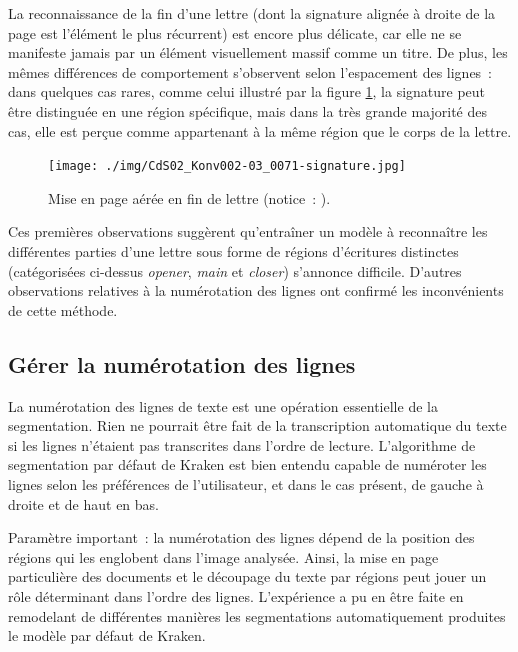 \documentclass[a4paper,12pt,twoside]{book}
\begin{document}
				La reconnaissance de la fin d'une lettre (dont la signature alignée à droite de la page est l'élément le plus récurrent) est encore plus délicate, car elle ne se manifeste jamais par un élément visuellement massif comme un titre. De plus, les mêmes différences de comportement s'observent selon l'espacement des lignes~: dans quelques cas rares, comme celui illustré par la figure \ref{seg-signaure-71}, la signature peut être distinguée en une région spécifique, mais dans la très grande majorité des cas, elle est perçue comme appartenant à la même région que le corps de la lettre.
				
				\begin{figure}[!h]
					\centering
					\texttt{[image: ./img/CdS02\_Konv002-03\_0071-signature.jpg]}%
					\caption{Mise en page aérée en fin de lettre (notice~: \cite{CdS02070071}).}%
					\label{seg-signaure-71}%
				\end{figure}
				
				Ces premières observations suggèrent qu'entraîner un modèle à reconnaître les différentes parties d'une lettre sous forme de régions d'écritures distinctes (catégorisées ci-dessus \textit{opener}, \textit{main} et \textit{closer}) s'annonce difficile. D'autres observations relatives à la numérotation des lignes ont confirmé les inconvénients de cette méthode.
				
			\subsection{Gérer la numérotation des lignes}
				La numérotation des lignes de texte est une opération essentielle de la segmentation. Rien ne pourrait être fait de la transcription automatique du texte si les lignes n'étaient pas transcrites dans l'ordre de lecture. L'algorithme de segmentation par défaut de Kraken est bien entendu capable de numéroter les lignes selon les préférences de l'utilisateur, et dans le cas présent, de gauche à droite et de haut en bas.
				
				Paramètre important~: la numérotation des lignes dépend de la position des régions qui les englobent dans l'image analysée. Ainsi, la mise en page particulière des documents et le découpage du texte par régions peut jouer un rôle déterminant dans l'ordre des lignes. L'expérience a pu en être faite en remodelant de différentes manières les segmentations automatiquement produites le modèle par défaut de Kraken.
				
\end{document}
